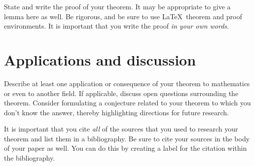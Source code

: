 \documentclass[12pt,a4paper,reqno,parskip=full]{amsart}
\numberwithin{equation}{section}
\theoremstyle{plain}
\theoremstyle{definition}
\begin{document}
State and write the proof of your theorem. It may be appropriate to give a lemma here as well. Be rigorous, and be sure to use \LaTeX\ theorem and proof environments. It is important that you write the proof \emph{in your own words}.

\section{Applications and discussion}

Describe at least one application or consequence of your theorem to mathematics or even to another field. If applicable, discuss open questions surrounding the theorem. Consider formulating a conjecture related to your theorem to which you don't know the answer, thereby highlighting directions for future research.

\begin{thebibliography}{10}

 It is important that you cite \emph{all} of the sources that you used to research your theorem and list them in a bibliography. Be sure to cite your sources in the body of your paper as well. You can do this by creating a label for the citation within the bibliography.

\end{thebibliography}
\end{document}
